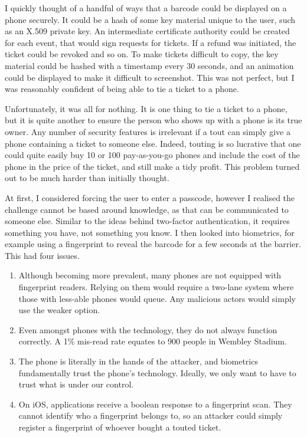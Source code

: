 \documentclass[12pt,a4]{bhamdissertation}
\begin{document}
I quickly thought of a handful of ways that a barcode could be displayed on a phone securely. It could be a hash of some key material unique to the user, such as an X.509 private key. An intermediate certificate authority could be created for each event, that would sign requests for tickets. If a refund was initiated, the ticket could be revoked and so on. To make tickets difficult to copy, the key material could be hashed with a timestamp every 30 seconds, and an animation could be displayed to make it difficult to screenshot. This was not perfect, but I was reasonably confident of being able to tie a ticket to a phone.

Unfortunately, it was all for nothing. It is one thing to tie a ticket to a phone, but it is quite another to ensure the person who shows up with a phone is its true owner. Any number of security features is irrelevant if a tout can simply give a phone containing a ticket to someone else. Indeed, touting is so lucrative that one could quite easily buy 10 or 100 pay-as-you-go phones and include the cost of the phone in the price of the ticket, and still make a tidy profit. This problem turned out to be much harder than initially thought.

At first, I considered forcing the user to enter a passcode, however I realised the challenge cannot be based around knowledge, as that can be communicated to someone else. Similar to the ideas behind two-factor authentication, it requires something you have, not something you know. I then looked into biometrics, for example using a fingerprint to reveal the barcode for a few seconds at the barrier. This had four issues.

\begin{enumerate}
    \item Although becoming more prevalent, many phones are not equipped with fingerprint readers. Relying on them would require a two-lane system where those with less-able phones would queue. Any malicious actors would simply use the weaker option.
    \item Even amongst phones with the technology, they do not always function correctly. A 1\% mis-read rate equates to 900 people in Wembley Stadium.
    \item The phone is literally in the hands of the attacker, and biometrics fundamentally trust the phone's technology. Ideally, we only want to have to trust what is under our control.
    \item On iOS, applications receive a boolean response to a fingerprint scan. They cannot identify who a fingerprint belongs to, so an attacker could simply register a fingerprint of whoever bought a touted ticket.
\end{enumerate}
\end{document}
